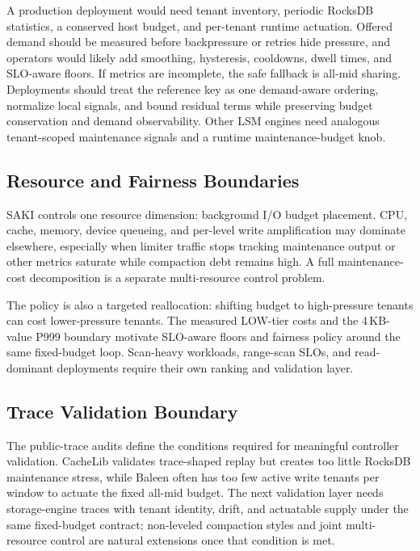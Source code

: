 A production deployment would need tenant inventory, periodic RocksDB
statistics, a conserved host budget, and per-tenant runtime actuation. Offered
demand should be measured before backpressure or retries hide pressure, and
operators would likely add smoothing, hysteresis, cooldowns, dwell times, and
SLO-aware floors. If metrics are incomplete, the safe fallback is all-mid
sharing. Deployments should treat the reference key as one demand-aware
ordering, normalize local signals, and bound residual terms while preserving
budget conservation and demand observability. Other LSM engines need analogous
tenant-scoped maintenance signals and a runtime maintenance-budget knob.

\subsection{Resource and Fairness Boundaries}

SAKI controls one resource dimension: background I/O budget placement. CPU,
cache, memory, device queueing, and per-level write amplification may dominate
elsewhere, especially when limiter traffic stops tracking maintenance output or
other metrics saturate while compaction debt remains high. A full
maintenance-cost decomposition is a separate multi-resource control problem.

The policy is also a targeted reallocation: shifting budget to high-pressure
tenants can cost lower-pressure tenants. The measured LOW-tier costs and the
4\,KB-value P999 boundary motivate SLO-aware floors and fairness policy around
the same fixed-budget loop. Scan-heavy workloads, range-scan SLOs, and
read-dominant deployments require their own ranking and validation layer.

\subsection{Trace Validation Boundary}

The public-trace audits define the conditions required for meaningful
controller validation. CacheLib validates trace-shaped replay but creates too
little RocksDB maintenance stress, while Baleen often has too few active write
tenants per window to actuate the fixed all-mid budget. The next validation
layer needs storage-engine traces with tenant identity, drift, and actuatable
supply under the same fixed-budget contract; non-leveled compaction styles and
joint multi-resource control are natural extensions once that condition is met.

